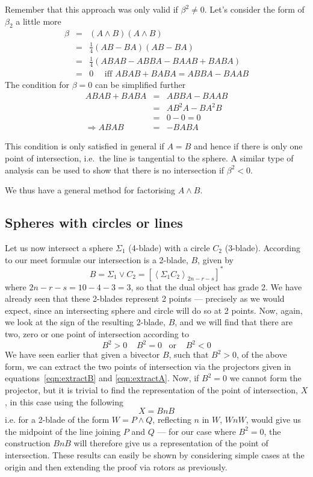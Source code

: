 Remember that this approach was only valid if $\beta^2 \ne 0$. Let's consider the
form of $\beta_2$ a little more 
\begin{eqnarray*}
\beta & = & (A \wedge B)(A \wedge B) \\
      & = & \frac{1}{4}(AB - BA)(AB - BA) \\
      & = & \frac{1}{4}(ABAB - ABBA - BAAB + BABA) \\
      & = & 0 \quad\mbox{ iff } ABAB + BABA = ABBA - BAAB
\end{eqnarray*}
The condition for $\beta = 0$ can be simplified further
\begin{eqnarray*}
ABAB + BABA & = & ABBA - BAAB \\
            & = & AB^2A - BA^2B \\
	    & = & 0 - 0 = 0 \\
\Rightarrow ABAB & = & -BABA 
\end{eqnarray*}

This condition is only satisfied in general if $A = B$ and hence 
if there is only one point of intersection, i.e.\ the line
is tangential to the sphere. A similar type of analysis can be used to
show that there is no intersection if $\beta^2 < 0$.

We thus have a general method for factorising $A \wedge B$.

\subsection{Spheres with circles or lines}

Let us now intersect a sphere $\Sigma_1$ (4-blade) with a
circle $C_2$ (3-blade). According to our meet formul\ae
our intersection is a 2-blade, $B$, given by
%
\begin{equation}
B = \Sigma_1 \vee C_2 = \left[\left< \Sigma_1 C_2
\right>_{2n-r-s}\right]^*
\end{equation}
%
where $2n-r-s=10-4-3=3$, so that the dual object has
grade 2. We have already seen that these 2-blades
represent 2 points --- precisely as we would expect, since
an intersecting sphere and circle will do so at 2 points.
Now, again, we look at the sign of the resulting 2-blade,
$B$, and we will find that there are two, zero or one
point of intersection according to
%
\[  B^2>0 \;\;\;\; B^2=0 \;\;\;\mbox{or}\;\;\;\; B^2<0
\]
%
We have seen earlier that given a bivector $B$, such that
$B^2>0$, of the above form, we can extract the two points
of intersection via the projectors given in
equations~\ref{eqn:extractB} and \ref{eqn:extractA}. Now, if $B^2=0$ we cannot form
the projector, but it is trivial to find the representation of the point of
intersection, $X$, in this case using the following
%
\[  X = BnB  \]
%
i.e. for a 2-blade of the form $W = P\wedge Q$, reflecting
$n$ in $W$, $WnW$, would give us the midpoint of the line
joining $P$ and $Q$ --- for our case where $B^2=0$, the
construction $BnB$ will therefore give us a representation of the point of
intersection. These results can easily be shown by
considering simple cases at the origin and then extending
the proof via rotors as previously.

